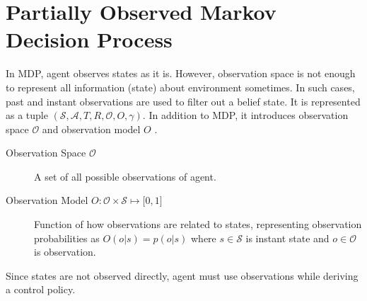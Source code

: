 \section{Partially Observed Markov Decision Process}
\label{sec:pomdp}

In MDP, agent observes states as it is. 
However, observation space is not enough to represent all information (state) about environment sometimes. 
In such cases, past and instant observations are used to filter out a belief state. 
It is represented as a tuple $(\mathcal{S},\mathcal{A},T,R,\mathcal{O},O,\gamma)$. 
In addition to MDP, it introduces observation space $\mathcal{O}$ and observation model $O$ \cite{francois-lavet_introduction_2018}. 

\begin{description}
	\item[Observation Space $\mathcal{O}$] A set of all possible observations of agent.
	\item[Observation Model $O \colon \mathcal{O} \times \mathcal{S} \mapsto \lbrack 0,1 \rbrack$] Function of how observations are related to states, 
	representing observation probabilities as $O(o|s) = p(o|s)$ 
	where $s \in \mathcal{S}$ is instant state and $o \in \mathcal{O}$ is observation.
\end{description}

Since states are not observed directly, agent must use observations while deriving a control policy. 